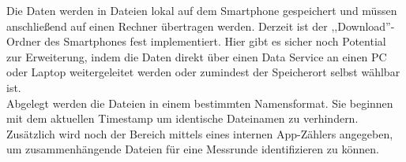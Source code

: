 Die Daten werden in Dateien lokal auf dem Smartphone gespeichert und müssen anschließend auf einen Rechner übertragen werden. Derzeit ist der ,,Download''-Ordner des Smartphones fest implementiert. Hier gibt es sicher noch Potential zur Erweiterung, indem die Daten direkt über einen Data Service an einen PC oder Laptop weitergeleitet werden oder zumindest der Speicherort selbst wählbar ist. \\
Abgelegt werden die Dateien in einem bestimmten Namensformat. Sie beginnen mit dem aktuellen Timestamp um identische Dateinamen zu verhindern. Zusätzlich wird noch der Bereich mittels eines internen App-Zählers angegeben, um zusammenhängende Dateien für eine Messrunde identifizieren zu können.